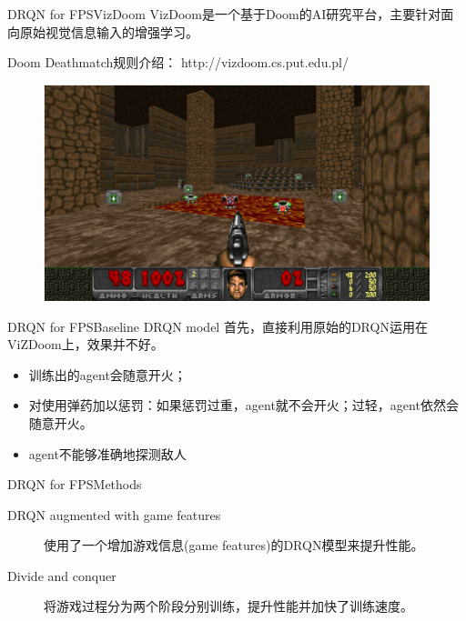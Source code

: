 \documentclass[10pt]{beamer}
\begin{document}
	\begin{frame}{DRQN for FPS}{VizDoom}
		VizDoom是一个基于Doom的AI研究平台，主要针对面向原始视觉信息输入的增强学习。
		
		Doom Deathmatch规则介绍：
		http://vizdoom.cs.put.edu.pl/
		
		\begin{figure}
			\centering
			\includegraphics[width=0.8\linewidth]{pictures/deathmatch}
		\end{figure}
	\end{frame}

	\begin{frame}{DRQN for FPS}{Baseline DRQN model}
		首先，直接利用原始的DRQN运用在ViZDoom上，效果并不好。
		\begin{itemize}
			\item 训练出的agent会随意开火；
			\item 对使用弹药加以惩罚：如果惩罚过重，agent就不会开火；过轻，agent依然会随意开火。
			\item agent不能够准确地探测敌人
		\end{itemize}
		
	\end{frame}

	\begin{frame}{DRQN for FPS}{Methods}
		\begin{description}
			\item[DRQN augmented with game features] 
			使用了一个增加游戏信息(game features)的DRQN模型来提升性能。
			
			\item[Divide and conquer]
			将游戏过程分为两个阶段分别训练，提升性能并加快了训练速度。
			
		\end{description}
	\end{frame}
\end{document}

